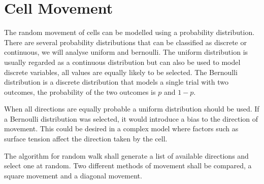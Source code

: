 \section{Cell Movement}


The random movement of cells can be modelled using a probability distribution.
There are several probability distributions that can be classified as discrete or continuous, we will analyse uniform and bernoulli.
The uniform distribution is usually regarded as a continuous distribution but can also be used to model discrete variables,
all values are equally likely to be selected.
The Bernoulli distribution is a discrete distribution that models a single trial with two outcomes,
the probability of the two outcomes is $p$ and $1-p$.







When all directions are equally probable a uniform distribution should be used.
If a Bernoulli distribution was selected, it would introduce a bias to the direction of movement.
This could be desired in a complex model where factors such as surface tension affect the direction taken by the cell.

The algorithm for random walk shall generate a list of available directions and select one at random.
Two different methods of movement shall be compared, a square movement and a diagonal movement.



